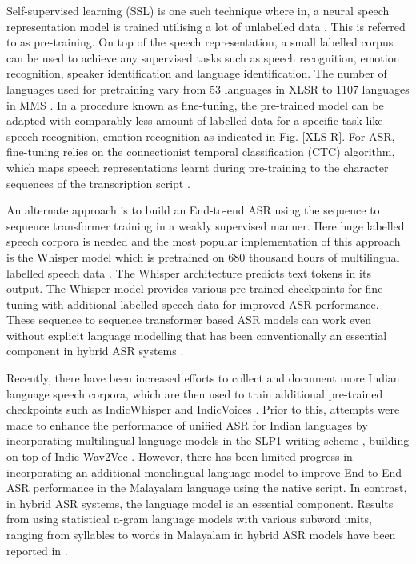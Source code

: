 \documentclass[runningheads]{llncs}
\begin{document}
Self-supervised learning (SSL) is one such technique where in, a neural speech representation model is trained utilising a lot of unlabelled data  \cite{baevski2020wav2vec,barrault2023seamlessm4t,conneau2020unsupervised,schneider2019wav2vec}. This is referred to as pre-training. On top of the speech representation, a small labelled corpus can be used to achieve any supervised tasks such as speech recognition, emotion recognition, speaker identification and language identification. The number of languages used for pretraining vary from 53 languages in XLSR to 1107 languages in MMS \cite{pratap2024scaling}. In a procedure known as fine-tuning, the pre-trained model can be adapted with comparably less amount of labelled data for a specific task like speech recognition, emotion recognition as indicated in Fig. \ref{XLS-R}. For ASR, fine-tuning relies on the connectionist temporal classification (CTC) algorithm, which maps speech representations learnt during pre-training to the character sequences of the transcription script \cite{georgescu2021performance}.

An alternate approach is to build an End-to-end ASR using the sequence to sequence transformer training in a weakly supervised manner. Here huge labelled speech corpora is needed and the most popular implementation of this approach is the Whisper model which is pretrained on 680 thousand hours of multilingual labelled speech data \cite{whisper}. The Whisper architecture predicts  text tokens in its output. The Whisper model provides various pre-trained checkpoints for fine-tuning with additional labelled speech data for improved ASR performance. These sequence to sequence transformer based ASR models can work even without explicit language modelling that has been conventionally an essential component in hybrid ASR systems \cite{manohar2023automatic,sherly2024asr}.

Recently, there have been increased efforts to collect and document more Indian language speech corpora, which are then used to train additional pre-trained checkpoints such as IndicWhisper \cite{bhogale2023vistaar} and IndicVoices \cite{javed2024indicvoices}. Prior to this, attempts were made to enhance the performance of unified ASR for Indian languages by incorporating multilingual language models in the SLP1 writing scheme \cite{anoop2022}, building on top of Indic Wav2Vec \cite{javed2022towards}. However, there has been limited progress in incorporating an additional monolingual language model to improve End-to-End ASR performance in the Malayalam language using the native script. In contrast, in hybrid ASR systems, the language model is an essential component. Results from using statistical n-gram language models with various subword units, ranging from syllables to words in Malayalam in hybrid ASR models have been reported in \cite{manohar2023improving}.
\end{document}
